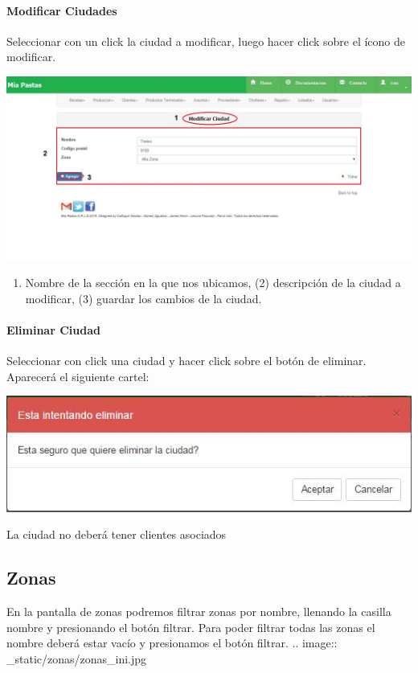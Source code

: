 \documentclass[letterpaper,10pt,english]{sphinxmanual}
\begin{document}
\paragraph{{}Modificar Ciudades}
\label{ciudades modificar:modificar-ciudades}\label{ciudades modificar::doc}
Seleccionar con un click la ciudad a modificar, luego hacer click sobre el ícono de modificar.

\includegraphics{ciudades_modificar.jpg}
\begin{enumerate}
\item {} 
Nombre de la sección en la que nos ubicamos, (2) descripción de la ciudad a modificar, (3)  guardar los cambios de la ciudad.

\end{enumerate}


\paragraph{{}Eliminar Ciudad}
\label{ciudades eliminar::doc}\label{ciudades eliminar:eliminar-ciudad}
Seleccionar con click una ciudad y hacer click sobre el botón de eliminar. Aparecerá el siguiente cartel:

\includegraphics{ciudades_eliminar.jpg}

La ciudad no deberá tener clientes asociados


\subsection{{}Zonas}
\label{zonas:zonas}\label{zonas::doc}
En la pantalla de zonas podremos filtrar zonas por nombre, llenando la casilla nombre y presionando el botón filtrar.
Para poder filtrar todas las zonas el nombre deberá estar vacío y presionamos el botón filtrar.
.. image:: \_static/zonas/zonas\_ini.jpg
\end{document}
